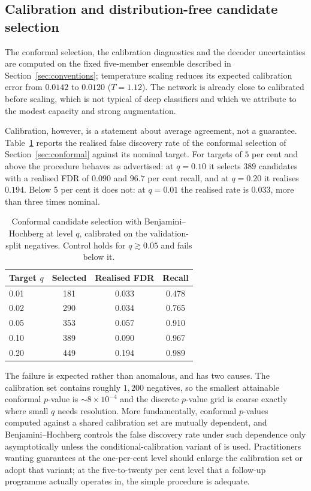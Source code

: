 \documentclass[preprint,12pt,authoryear]{elsarticle}
\begin{document}
\subsection{Calibration and distribution-free candidate selection}
\label{sec:conformalresult}

The conformal selection, the calibration diagnostics and the decoder
uncertainties are computed on the fixed five-member ensemble described in
Section~\ref{sec:conventions}; temperature scaling reduces its expected
calibration error from $0.0142$ to $0.0120$ ($T = 1.12$). The network is
already close to calibrated before scaling, which is not typical of deep
classifiers \citep{Guo2017} and which we attribute to the modest capacity and
strong augmentation.

Calibration, however, is a statement about average agreement, not a guarantee.
Table~\ref{tab:conformal} reports the realised false discovery rate of the
conformal selection of Section~\ref{sec:conformal} against its nominal target.
For targets of $5$ per cent and above the procedure behaves as advertised: at
$q=0.10$ it selects $389$ candidates with a realised FDR of $0.090$ and $96.7$
per cent recall, and at $q = 0.20$ it realises $0.194$. Below $5$ per cent it
does not: at $q = 0.01$ the realised rate is $0.033$, more than three times
nominal.

\begin{table}[t]
\centering
\caption{Conformal candidate selection with Benjamini--Hochberg at level $q$,
calibrated on the validation-split negatives. Control holds for
$q \gtrsim 0.05$ and fails below it.}
\label{tab:conformal}
\begin{tabular}{lccc}
\toprule
Target $q$ & Selected & Realised FDR & Recall \\
\midrule
0.01 & 181 & 0.033 & 0.478 \\
0.02 & 290 & 0.034 & 0.765 \\
0.05 & 353 & 0.057 & 0.910 \\
0.10 & 389 & 0.090 & 0.967 \\
0.20 & 449 & 0.194 & 0.989 \\
\bottomrule
\end{tabular}
\end{table}

The failure is expected rather than anomalous, and has two causes. The
calibration set contains roughly $1{,}200$ negatives, so the smallest attainable
conformal $p$-value is $\sim$$8\times10^{-4}$ and the discrete $p$-value grid is
coarse exactly where small $q$ needs resolution. More fundamentally, conformal
$p$-values computed against a shared calibration set are mutually dependent, and
Benjamini--Hochberg controls the false discovery rate under such dependence only
asymptotically unless the conditional-calibration variant of \citet{Bates2023} is
used. Practitioners wanting guarantees at the one-per-cent level should enlarge
the calibration set or adopt that variant; at the five-to-twenty per cent level
that a follow-up programme actually operates in, the simple procedure is
adequate.
\end{document}
